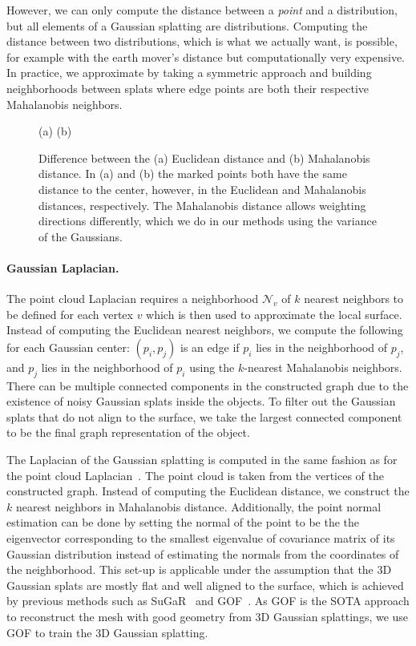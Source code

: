 However, we can only compute the distance between a \emph{point} and a distribution, but all elements of a Gaussian splatting are distributions. 
Computing the distance between two distributions, which is what we actually want, is possible, for example with the earth mover's distance but computationally very expensive. 
In practice, we approximate by taking a symmetric approach and building neighborhoods between splats where edge points are both their respective Mahalanobis neighbors.

\begin{figure}
    \centering
    (a)  \quad (b) 
    \caption{Difference between the (a) Euclidean distance and (b) Mahalanobis distance. In (a) and (b) the marked points both have the same distance to the center, however, in the Euclidean and Mahalanobis distances, respectively. The Mahalanobis distance allows weighting directions differently, which we do in our methods using the variance of the Gaussians. }
    \label{fig:mahalanobis}
\end{figure}

\paragraph{Gaussian Laplacian.} 
The point cloud Laplacian requires a neighborhood $\mathcal{N}_v$ of $k$ nearest neighbors to be defined for each vertex $v$ which is then used to approximate the local surface. 
Instead of computing the Euclidean nearest neighbors, we compute the following for each Gaussian center:
$(p_i, p_j)$ is an edge if $p_i$ lies in the neighborhood of $p_j$, and $p_j$ lies in the neighborhood of $p_i$ using the $k$-nearest Mahalanobis neighbors. 
There can be multiple connected components in the constructed graph due to the existence of noisy Gaussian splats inside the objects. 
To filter out the Gaussian splats that do not align to the surface, we take the largest connected component to be the final graph representation of the object. %

The Laplacian of the Gaussian splatting is computed in the same fashion as for the point cloud Laplacian~\cite{sharp2020nonmanifold}. The point cloud is taken from the vertices of the constructed graph. Instead of computing the Euclidean distance, we construct the $k$ nearest neighbors in Mahalanobis distance. 
Additionally, the point normal estimation can be done by setting the normal of the point to be the the eigenvector corresponding to the smallest eigenvalue of covariance matrix of its Gaussian distribution instead of estimating the normals from the coordinates of the neighborhood. 
This set-up is applicable under the assumption that the 3D Gaussian splats are mostly flat and well aligned to the surface, which is achieved by previous methods such as SuGaR~\cite{guedon2023sugar} and GOF~\cite{yu2024gaussian}. As GOF is the SOTA approach to reconstruct the mesh with good geometry from 3D Gaussian splattings, we use GOF to train the 3D Gaussian splatting.  %

